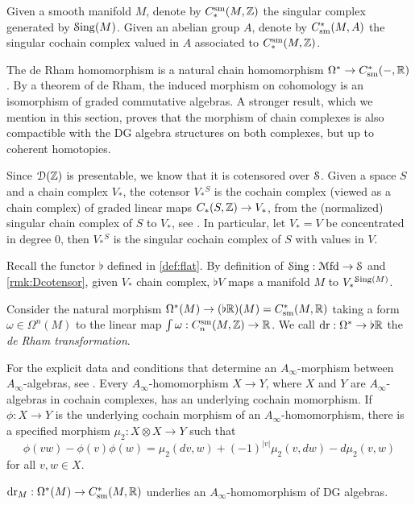 \documentclass[10pt]{amsart}
\begin{document}
\begin{remark}
  Given a smooth manifold $M$, denote by $C_*^{\mathrm{sm}}(M,\mathbb{Z})$ the singular complex generated by $\mathcal{S}\mathrm{ing}(M)$. Given an abelian group $A$, denote by $C^*_{\mathrm{sm}}(M,A)$ the singular cochain complex valued in $A$ associated to $C_*^{\mathrm{sm}}(M,\mathbb{Z})$. 
\end{remark}
The de Rham homomorphism is a natural chain homomorphism $\Omega^*\to C_{\mathrm{sm}}^*(-,\mathbb{R})$. By a theorem of de Rham, the induced morphism on cohomology is an isomorphism of graded commutative algebras. A stronger result, which we mention in this section, proves that the morphism of chain complexes is also compactible with the DG algebra structures on both complexes, but {up to coherent homotopies}. 
\begin{remark}\label{rmk:Dcotensor}
  Since $\mathcal{D}(\mathbb{Z})$ is presentable, we know that it is cotensored over $\mathcal{S}$. Given a space $S$ and a chain complex $V_*$, the cotensor $V_*{}^S$ is the cochain complex (viewed as a chain complex) of graded linear maps $C_*(S,\mathbb{Z})\to V_*$, from the (normalized) singular chain complex of $S$ to $V_*$, see \cite[Definition 1.3.2.1]{lurie2017ha}. In particular, let $V_*=V$ be concentrated in degree 0, then $V_*{}^S$ is the singular cochain complex of $S$ with values in $V$. 
\end{remark}
Recall the functor $\flat$ defined in \cref{def:flat}. By definition of $\mathcal{S}\mathrm{ing}:\mathcal{M}\mathrm{fd}\to\mathcal{S}$ and \cref{rmk:Dcotensor}, given $V_*$ chain complex, $\flat V$ maps a manifold $M$ to $V_*{}^{\mathcal{S}\mathrm{ing}(M)}$. 
\begin{definition}\label{def:derhammorf}
Consider the natural morphism $\Omega^*(M)\to (\flat\mathbb{R})(M)=C_{\mathrm{sm}}^*(M,\mathbb{R})$ taking a form $\omega\in\Omega^n(M)$ to the linear map $\int\omega:C^{\mathrm{sm}}_{n}(M,\mathbb{Z})\to\mathbb{R}$. We call $\mathrm{dr}:\Omega^*\to\flat\mathbb{R}$ the \emph{de Rham transformation}.  
\end{definition}
\begin{remark}\label{rmk:ainfmor}
  For the explicit data and conditions that determine an $A_\infty$-morphism between $A_\infty$-algebras, see \cite[Proposition 10.2.12]{loday2012algebraic}. Every $A_\infty$-homomorphism $X\to Y$, where $X$ and $Y$ are $A_\infty$-algebras in cochain complexes, has an underlying cochain momorphism. If $\phi:X\to Y$ is the underlying cochain morphism of an $A_\infty$-homomorphism, there is a specified morphism $\mu_2:X\otimes X\to Y$ such that $$\phi(vw)-\phi(v)\phi(w)=\mu_2(dv,w)+(-1)^{|v|}\mu_2(v,dw)-d\mu_2(v,w)$$for all $v,w\in X$. 
\end{remark}
\begin{theorem}\label{thm:derham} 
  $\mathrm{dr}_M:\Omega^*(M)\to C^*_{\mathrm{sm}}(M,\mathbb{R})$ underlies an $A_\infty$-homomorphism of DG algebras. 
\end{theorem}
\end{document}
